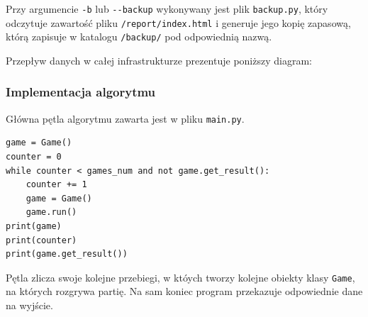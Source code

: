 \documentclass[12pt,a4paper]{article}
\begin{document}
Przy argumencie \texttt{-b} lub \texttt{-{}-backup} wykonywany jest plik \texttt{backup.py}, który odczytuje zawartość pliku \texttt{/report/index.html} i generuje jego kopię zapasową, którą zapisuje w katalogu \texttt{/backup/} pod odpowiednią nazwą.

Przepływ danych w całej infrastrukturze prezentuje poniższy diagram:

\begin{center}
\end{center}

\subsubsection*{Implementacja algorytmu}

Główna pętla algorytmu zawarta jest w pliku \texttt{main.py}.

\begin{lstlisting}
game = Game()
counter = 0
while counter < games_num and not game.get_result():
    counter += 1
    game = Game()
    game.run()
print(game)
print(counter)
print(game.get_result())
\end{lstlisting}

Pętla zlicza swoje kolejne przebiegi, w któych tworzy kolejne obiekty klasy \texttt{Game}, na których rozgrywa partię. Na sam koniec program przekazuje odpowiednie dane na wyjście.
\end{document}
